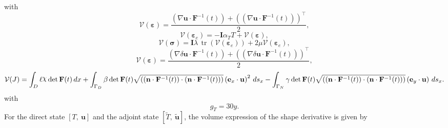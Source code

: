 \documentclass[preview]{standalone}
\let\oldcdot\cdot
\let\cdot\oldcdot
\begin{document}
with
\begin{dmath*}
\mathcal V(\bm\varepsilon) = \frac{\left(  \nabla {\mathbf{ u }}  \cdot  \mathbf F^{-1}(t) \right) +  \left( \left(  \nabla {\mathbf{ u }}  \cdot  \mathbf F^{-1}(t) \right) \right)^\top }{2},
 \end{dmath*}
\begin{dmath*}
\mathcal V(\pmb\varepsilon_{e}) = - \mathbf{I} \alpha_{T} T + \mathcal V(\bm\varepsilon),
 \end{dmath*}
\begin{dmath*}
\mathcal V(\pmb \sigma) = \mathbf{I} \lambda  \,\operatorname{tr}\left(\mathcal V(\pmb\varepsilon_{e})\right)  + 2 \mu \mathcal V(\pmb\varepsilon_{e}),
 \end{dmath*}
\begin{dmath*}
\mathcal V(\pmb\varepsilon) = \frac{\left(  \nabla {\delta\mathbf{  u }}  \cdot  \mathbf F^{-1}(t) \right) +  \left( \left(  \nabla {\delta\mathbf{  u }}  \cdot  \mathbf F^{-1}(t) \right) \right)^\top }{2},
 \end{dmath*}
\begin{dmath*}
\mathcal V(J) =  \int_{D} \ell \raisebox{\depth}{$\chi$}  \operatorname{det}\mathbf F( t )  \,dx +  \int_{\Gamma_D} \beta  \operatorname{det}\mathbf F( t )  \sqrt{\left( \left( \mathbf n \cdot  \mathbf F^{-1}(t) \right) \cdot \left( \mathbf n \cdot  \mathbf F^{-1}(t) \right) \right)} \left( \mathbf e_x \cdot {\mathbf{ u }} \right)^{2} \,ds_x -  \int_{\Gamma_N} \gamma  \operatorname{det}\mathbf F( t )  \sqrt{\left( \left( \mathbf n \cdot  \mathbf F^{-1}(t) \right) \cdot \left( \mathbf n \cdot  \mathbf F^{-1}(t) \right) \right)} \left( \mathbf e_y \cdot {\mathbf{ u }} \right) \,ds_x.
 \end{dmath*}
with 
\begin{dmath*}
g_{T} = 30 y.\end{dmath*}
For the direct state $\left[ T, \  {\mathbf{ u }}\right]$ and the adjoint state $\left[ \tilde T, \  \tilde{\mathbf{ u }}\right]$, the volume expression of the shape derivative is given by
\end{document}
